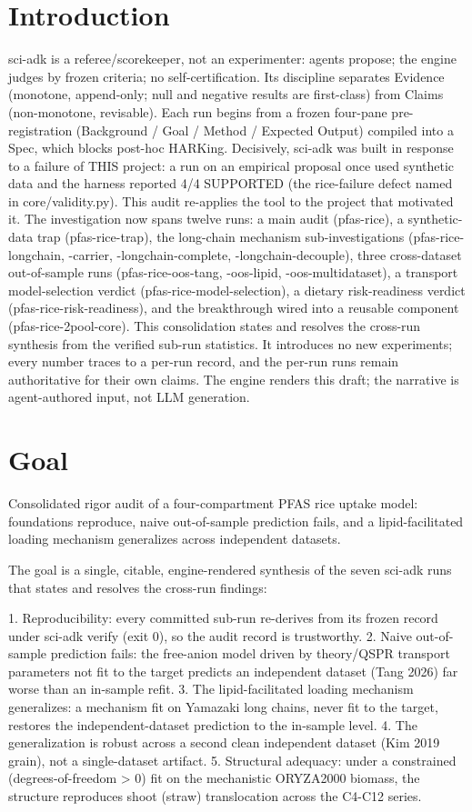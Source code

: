 \documentclass{article}
\begin{document}
\section{Introduction}
sci-adk is a referee/scorekeeper, not an experimenter: agents propose; the engine judges by frozen criteria; no self-certification. Its discipline separates Evidence (monotone, append-only; null and negative results are first-class) from Claims (non-monotone, revisable). Each run begins from a frozen four-pane pre-registration (Background / Goal / Method / Expected Output) compiled into a Spec, which blocks post-hoc HARKing. Decisively, sci-adk was built in response to a failure of THIS project: a run on an empirical proposal once used synthetic data and the harness reported 4/4 SUPPORTED (the rice-failure defect named in core/validity.py). This audit re-applies the tool to the project that motivated it. The investigation now spans twelve runs: a main audit (pfas-rice), a synthetic-data trap (pfas-rice-trap), the long-chain mechanism sub-investigations (pfas-rice-longchain, -carrier, -longchain-complete, -longchain-decouple), three cross-dataset out-of-sample runs (pfas-rice-oos-tang, -oos-lipid, -oos-multidataset), a transport model-selection verdict (pfas-rice-model-selection), a dietary risk-readiness verdict (pfas-rice-risk-readiness), and the breakthrough wired into a reusable component (pfas-rice-2pool-core). This consolidation states and resolves the cross-run synthesis from the verified sub-run statistics. It introduces no new experiments; every number traces to a per-run record, and the per-run runs remain authoritative for their own claims. The engine renders this draft; the narrative is agent-authored input, not LLM generation.

\section{Goal}
Consolidated rigor audit of a four-compartment PFAS rice uptake model: foundations reproduce, naive out-of-sample prediction fails, and a lipid-facilitated loading mechanism generalizes across independent datasets.

The goal is a single, citable, engine-rendered synthesis of the seven
sci-adk runs that states and resolves the cross-run findings:

1. Reproducibility: every committed sub-run re-derives from its frozen
   record under sci-adk verify (exit 0), so the audit record is
   trustworthy.
2. Naive out-of-sample prediction fails: the free-anion model driven by
   theory/QSPR transport parameters not fit to the target predicts an
   independent dataset (Tang 2026) far worse than an in-sample refit.
3. The lipid-facilitated loading mechanism generalizes: a mechanism fit
   on Yamazaki long chains, never fit to the target, restores the
   independent-dataset prediction to the in-sample level.
4. The generalization is robust across a second clean independent
   dataset (Kim 2019 grain), not a single-dataset artifact.
5. Structural adequacy: under a constrained (degrees-of-freedom > 0) fit
   on the mechanistic ORYZA2000 biomass, the structure reproduces shoot
   (straw) translocation across the C4-C12 series.
\end{document}
